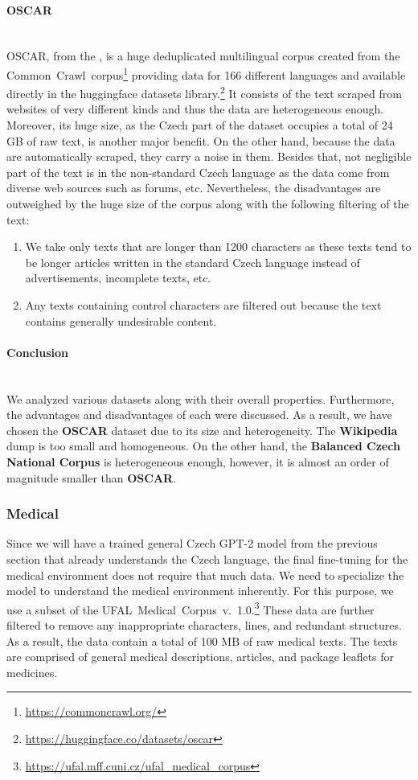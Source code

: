 \paragraph*{OSCAR} ~\\
\indent OSCAR, from the \citet{ortiz-suarez-etal-2020-monolingual}, is a huge deduplicated multilingual corpus created from the Common~Crawl~corpus\footnote[5]{\url{https://commoncrawl.org/}} providing data for 166 different languages and available directly in the huggingface datasets library.\footnote[6]{\url{https://huggingface.co/datasets/oscar}} It consists of the text scraped from websites of very different kinds and thus the data are heterogeneous enough. Moreover, its huge size, as the Czech part of the dataset occupies a total of 24 GB of raw text, is another major benefit. On the other hand, because the data are automatically scraped, they carry a noise in them. Besides that, not negligible part of the text is in the non-standard Czech language as the data come from diverse web sources such as forums, etc. Nevertheless, the disadvantages are outweighed by the huge size of the corpus along with the following filtering of the text:
\begin{enumerate}
	\item We take only texts that are longer than 1200 characters as these texts tend to be longer articles written in the standard Czech language instead of advertisements, incomplete texts, etc.
	\item Any texts containing control characters are filtered out because the text contains generally undesirable content.
\end{enumerate}

\paragraph*{Conclusion} ~\\
\indent We analyzed various datasets along with their overall properties. Furthermore, the advantages and disadvantages of each were discussed. As a result, we have chosen the \textbf{OSCAR} dataset due to its size and heterogeneity. The \textbf{Wikipedia} dump is too small and homogeneous. On the other hand, the \textbf{Balanced Czech National Corpus} is heterogeneous enough, however, it is almost an order of magnitude smaller than \textbf{OSCAR}.

\subsubsection{Medical}
Since we will have a trained general Czech GPT-2 model from the previous section that already understands the Czech language, the final fine-tuning for the medical environment does not require that much data. We need to specialize the model to understand the medical environment inherently. For this purpose, we use a subset of the UFAL~Medical~Corpus~v.\ 1.0.\footnote[7]{\url{https://ufal.mff.cuni.cz/ufal\_medical\_corpus}} These data are further filtered to remove any inappropriate characters, lines, and redundant structures. As a result, the data contain a total of 100 MB of raw medical texts. The texts are comprised of general medical descriptions, articles, and package leaflets for medicines.

